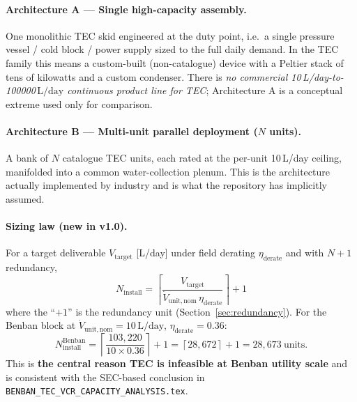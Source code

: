 \documentclass[11pt,a4paper]{article}
\newcommand{\SI}[2]{#1\,\ensuremath{\mathrm{#2}}}
\providecommand{\day}{day}
\providecommand{\liter}{L}
\begin{document}
\paragraph{Architecture A --- Single high-capacity assembly.}
One monolithic TEC skid engineered at the duty point, i.e.\ a single pressure vessel / cold block / power supply sized to the full daily demand. In the TEC family this means a custom-built (non-catalogue) device with a Peltier stack of tens of kilowatts and a custom condenser. There is \emph{no commercial 10\,L/day-to-\SI{100000}{\liter/\day} continuous product line for TEC}; Architecture A is a conceptual extreme used only for comparison.

\paragraph{Architecture B --- Multi-unit parallel deployment ($N$ units).}
A bank of $N$ catalogue TEC units, each rated at the per-unit 10\,L/day ceiling, manifolded into a common water-collection plenum. This is the architecture actually implemented by industry \citep{salehi2020awgreview} and is what the repository has implicitly assumed.

\paragraph{Sizing law (new in v1.0).}
For a target deliverable $V_{\mathrm{target}}$ [L/day] under field derating $\eta_{\mathrm{derate}}$ and with $N{+}1$ redundancy,
\begin{equation}
\boxed{\;N_{\mathrm{install}}
= \left\lceil \frac{V_{\mathrm{target}}}{\dot{V}_{\mathrm{unit,nom}}\,\eta_{\mathrm{derate}}} \right\rceil + 1\;}
\label{eq:sizing_law}
\end{equation}
where the ``$+1$'' is the redundancy unit (Section~\ref{sec:redundancy}). For the Benban block at $\dot{V}_{\mathrm{unit,nom}}{=}\SI{10}{\liter/\day}$, $\eta_{\mathrm{derate}}{=}0.36$:
\begin{equation}
N_{\mathrm{install}}^{\mathrm{Benban}}
= \left\lceil \frac{103{,}220}{10\times 0.36} \right\rceil + 1
= \left\lceil 28{,}672 \right\rceil + 1 = 28{,}673\ \text{units}.
\label{eq:benban_install_count}
\end{equation}
This is \textbf{the central reason TEC is infeasible at Benban utility scale} and is consistent with the SEC-based conclusion in \texttt{BENBAN\_TEC\_VCR\_CAPACITY\_ANALYSIS.tex}.

\end{document}
